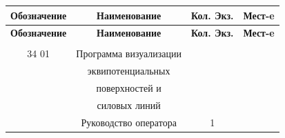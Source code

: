 \documentclass[14pt,a4paper,final]{extreport}
\newlength{\rs}
\begin{document}
	\begin{center}
	\begin{longtable}{|c|c|c|c|}
		
		\hline
		\textbf{Обозначение} & \textbf{Наименование} & \textbf{Кол.	Экз.} & \textbf{Мест-e} \\
		\hline
		\endfirsthead
		\hline
		\textbf{Обозначение} & \textbf{Наименование} & \textbf{Кол.	Экз.} & \textbf{Мест-e} \\
		\hline
		\endhead
		
		\endfoot
		\hline
		\endlastfoot
			
			& & & \\ \hline			
			\cipher-01 34 01& Программа визуализации && \\ \hline
			&эквипотенциальных && \\ \hline
			&поверхностей и && \\ \hline
			&силовых линий&& \\ \hline
			&Руководство оператора & 1 & \\ 	\hline	
			
			
			
		\end{longtable}
	\end{center}
	
	
	
	\pagebreak
	
	\label{lastpage}
	
\end{document}
